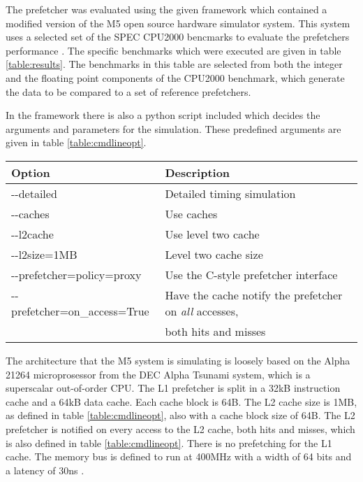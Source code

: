 The prefetcher was evaluated using the given framework which contained a modified version of the M5 open source hardware simulator system. This system uses a selected set of the SPEC CPU2000 bencmarks to evaluate the prefetchers performance \cite{reference:spec}. The specific benchmarks which were executed are given in table \ref{table:results}. The benchmarks in this table are selected from both the integer and the floating point components of the CPU2000 benchmark, which generate the data to be compared to a set of reference prefetchers. 

In the framework there is also a python script included which decides the arguments and parameters for the simulation. These predefined arguments are given in table \ref{table:cmdlineopt}.

\begin{table*}[!t]
\renewcommand{\arraystretch}{1.3}
\caption{Python script command line options}
\label{table:cmdlineopt}
\centering
\begin{tabular}{l l}
\bfseries Option & \bfseries Description\\
\hline
-\--detailed & Detailed timing simulation\\
-\--caches & Use caches\\
-\--l2cache & Use level two cache\\
-\--l2size=1MB & Level two cache size\\
-\--prefetcher=policy=proxy & Use the C-style prefetcher interface\\
-\--prefetcher=on\_access=True & Have the cache notify the prefetcher on \emph{all} accesses,\\& both hits and misses\\
\hline
\end{tabular}
\end{table*}

The architecture that the M5 system is simulating is loosely based on the Alpha 21264 microprosessor from the DEC Alpha Tsunami system, which is a superscalar out-of-order CPU. The L1 prefetcher is split in a 32kB instruction cache and a 64kB data cache. Each cache block is 64B. The L2 cache size is 1MB, as defined in table \ref{table:cmdlineopt}, also with a cache block size of 64B. The L2 prefetcher is notified on every access to the L2 cache, both hits and misses, which is also defined in table \ref{table:cmdlineopt}. There is no prefetching for the L1 cache. The memory bus is defined to run at 400MHz with a width of 64 bits and a latency of 30ns \cite{reference:opg}. 

